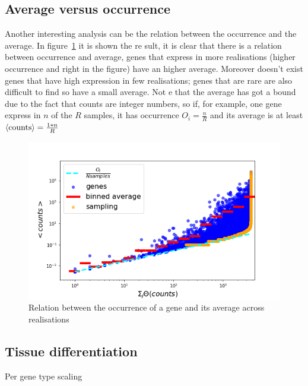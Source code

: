 \subsection{Average versus occurrence}
Another interesting analysis can be the relation between the occurrence and the average. In figure~\ref{fig:scalelaws/gtex/meanDiff_binned_sampling} it is shown the re
sult, it is clear that there is a relation between occurrence and average, genes that express in more realisations (higher occurrence and right in the figure) have an
higher average. Moreover doesn't exist genes that have high expression in few realisations; genes that are rare are also difficult to find so have a small average. Not
e that the average has got a bound due to the fact that counts are integer numbers, so if, for example, one gene express in $n$ of the $R$ samples, it has occurrence $
O_i=\frac{n}{R}$ and its average is at least $\left\langle \mathrm{counts}\right\rangle=\frac{1*n}{R}$
\begin{figure}[htb!]
    \centering
    \includegraphics[width=0.9\linewidth]{pictures/scalelaws/gtex/meanDiff_binned_sampling.png}
    \caption{Relation between the occurrence of a gene and its average across realisations}
    \label{fig:scalelaws/gtex/meanDiff_binned_sampling}
\end{figure}

\subsection{Tissue differentiation}
Per gene type scaling
